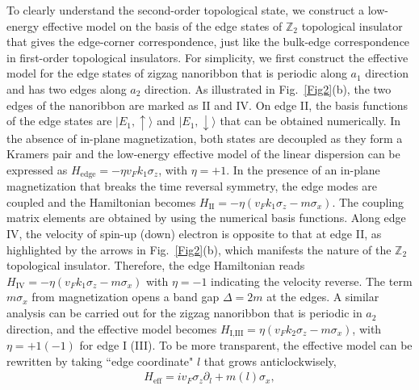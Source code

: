 \documentclass[aps,prl,twocolumn,showpacs,superscriptaddress]{revtex4-1}
\begin{document}
To clearly understand the second-order topological state, we construct a low-energy effective model on the basis of the edge states of $\mathbb{Z}_2$ topological insulator that gives the edge-corner correspondence, just like the bulk-edge correspondence in first-order topological insulators. For simplicity, we first construct the effective model for the edge states of zigzag nanoribbon that is periodic along $a_1$ direction and has two edges along $a_2$ direction. As illustrated in Fig.~\ref{Fig2}(b), the two edges of the nanoribbon are marked as II and IV.
On edge II, the basis functions of the edge states are $|E_1,\uparrow\rangle$ and $|E_1,\downarrow\rangle$ that can be obtained numerically.
In the absence of in-plane magnetization, both states are decoupled as they form a Kramers pair and the low-energy effective model of the linear dispersion can be expressed as $H_{\text{edge}}=-\eta v_Fk_1\sigma_z$, with $\eta=+1$. In the presence of an in-plane magnetization that breaks the time reversal symmetry, the edge modes are coupled and the Hamiltonian becomes $H_{\text{II}}=-\eta (v_Fk_1\sigma_z-m\sigma_x)$. The coupling matrix elements are obtained by using the numerical basis functions.
Along edge IV, the velocity of spin-up (down) electron is opposite to that at edge II, as highlighted by the arrows in Fig.~\ref{Fig2}(b), which manifests the nature of the $\mathbb{Z}_2$ topological insulator.
%
Therefore, the edge Hamiltonian reads $H_{\text{IV}}=-\eta (v_Fk_1\sigma_z-m\sigma_x)$ with $\eta=-1$ indicating the velocity reverse. The term $m\sigma_x$ from magnetization opens a band gap $\Delta=2m$ at the edges. A similar analysis can be carried out for the zigzag nanoribbon that is periodic in $a_2$ direction, and the effective model becomes $H_{\text{I,III}}=\eta (v_Fk_2\sigma_z-m\sigma_x)$, with $\eta=+1 (-1)$ for edge I (III). To be more transparent, the effective model can be rewritten by taking ``edge coordinate" $l$ that grows anticlockwisely,
\begin{eqnarray}\label{eq:EffHam}
H_{\text{eff}} =iv_F\sigma_z\partial_l+m(l)\sigma_x,
\end{eqnarray}
\end{document}
